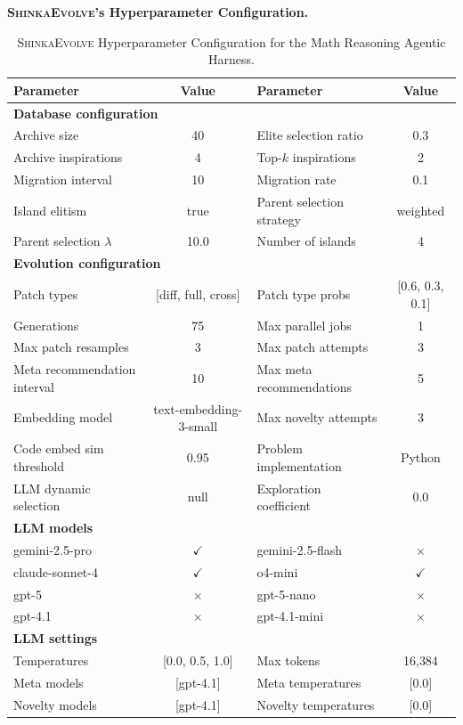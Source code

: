 \documentclass[11pt, a4paper]{include/gdm_format}
\newcommand{\ouralgo}{\textsc{ShinkaEvolve}\xspace}
\begin{document}
{\textbf{\ouralgo's Hyperparameter Configuration.}

\begin{table}[h]
\centering
\small
\begin{tabular}{lclc}
\toprule
\textbf{Parameter} & \textbf{Value} & \textbf{Parameter} & \textbf{Value} \\
\midrule
\multicolumn{4}{l}{\textbf{Database configuration}} \\
\midrule
Archive size & 40 & Elite selection ratio & 0.3 \\
Archive inspirations & 4 & Top-$k$ inspirations & 2 \\
Migration interval & 10 & Migration rate & 0.1 \\
Island elitism & true & Parent selection strategy & weighted \\
Parent selection $\lambda$ & 10.0 & Number of islands & 4 \\
\midrule
\multicolumn{4}{l}{\textbf{Evolution configuration}} \\
\midrule
Patch types & [diff, full, cross] & Patch type probs & [0.6, 0.3, 0.1] \\
Generations & 75 & Max parallel jobs & 1 \\
Max patch resamples & 3 & Max patch attempts & 3 \\
Meta recommendation interval & 10 & Max meta recommendations & 5 \\
Embedding model & text-embedding-3-small & Max novelty attempts & 3 \\
Code embed sim threshold & 0.95 & Problem implementation & Python \\
LLM dynamic selection & null & Exploration coefficient & 0.0 \\
\midrule
\multicolumn{4}{l}{\textbf{LLM models}} \\
\midrule
gemini-2.5-pro & $\checkmark$ & gemini-2.5-flash & $\times$ \\
claude-sonnet-4 & $\checkmark$ & o4-mini & $\checkmark$ \\
gpt-5 & $\times$ & gpt-5-nano & $\times$ \\
gpt-4.1 & $\times$ & gpt-4.1-mini & $\times$ \\
\midrule
\multicolumn{4}{l}{\textbf{LLM settings}} \\
\midrule
Temperatures & [0.0, 0.5, 1.0] & Max tokens & 16{,}384 \\
Meta models & [gpt-4.1] & Meta temperatures & [0.0] \\
Novelty models & [gpt-4.1] & Novelty temperatures & [0.0] \\
\bottomrule
\end{tabular}
  \caption{\ouralgo Hyperparameter Configuration for the Math Reasoning Agentic Harness.}
  \label{tab:hyperparams_aime}
\end{table}

}
\end{document}
